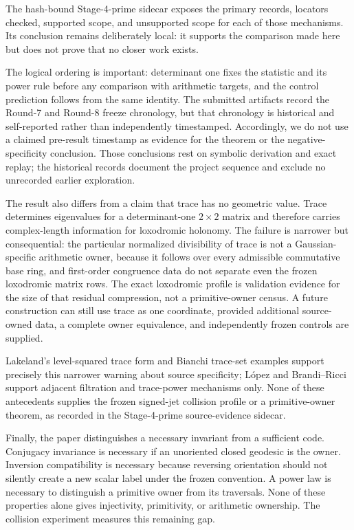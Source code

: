 \documentclass[11pt,a4paper]{article}
\theoremstyle{definition}
\theoremstyle{remark}
\begin{document}
The hash-bound Stage-4-prime sidecar exposes the primary records, locators checked, supported scope, and unsupported scope for each of those mechanisms. Its conclusion remains deliberately local: it supports the comparison made here but does not prove that no closer work exists.

The logical ordering is important: determinant one fixes the statistic and its power rule before any comparison with arithmetic targets, and the control prediction follows from the same identity. The submitted artifacts record the Round-7 and Round-8 freeze chronology, but that chronology is historical and self-reported rather than independently timestamped. Accordingly, we do not use a claimed pre-result timestamp as evidence for the theorem or the negative-specificity conclusion. Those conclusions rest on symbolic derivation and exact replay; the historical records document the project sequence and exclude no unrecorded earlier exploration.

The result also differs from a claim that trace has no geometric value. Trace determines eigenvalues for a determinant-one \(2\times2\) matrix and therefore carries complex-length information for loxodromic holonomy. The failure is narrower but consequential: the particular normalized divisibility of trace is not a Gaussian-specific arithmetic owner, because it follows over every admissible commutative base ring, and first-order congruence data do not separate even the frozen loxodromic matrix rows. The exact loxodromic profile is validation evidence for the size of that residual compression, not a primitive-owner census. A future construction can still use trace as one coordinate, provided additional source-owned data, a complete owner equivalence, and independently frozen controls are supplied.

Lakeland's level-squared trace form and Bianchi trace-set examples support precisely this narrower warning about source specificity; López and Brandi--Ricci support adjacent filtration and trace-power mechanisms only. None of these antecedents supplies the frozen signed-jet collision profile or a primitive-owner theorem, as recorded in the Stage-4-prime source-evidence sidecar.

Finally, the paper distinguishes a necessary invariant from a sufficient code. Conjugacy invariance is necessary if an unoriented closed geodesic is the owner. Inversion compatibility is necessary because reversing orientation should not silently create a new scalar label under the frozen convention. A power law is necessary to distinguish a primitive owner from its traversals. None of these properties alone gives injectivity, primitivity, or arithmetic ownership. The collision experiment measures this remaining gap.
\end{document}
